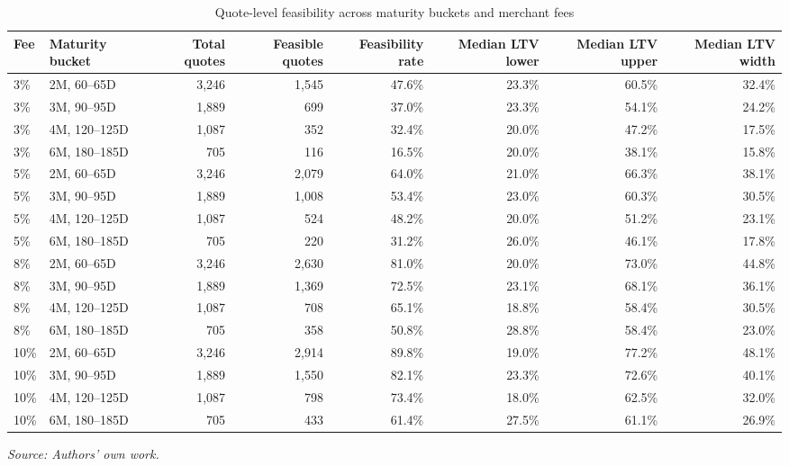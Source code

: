 \documentclass[11pt]{article}
\begin{document}
\begin{table}[htbp]
\centering
\caption{Quote-level feasibility across maturity buckets and merchant fees}
\label{tab:quote_level_feasibility}
\small
\begin{adjustbox}{max width=\textwidth}
\begin{tabular}{llrrrrrr}
\toprule
Fee & Maturity bucket & Total quotes & Feasible quotes & Feasibility rate & Median LTV lower & Median LTV upper & Median LTV width \\
\midrule
3\%  & 2M, 60--65D   & 3,246 & 1,545 & 47.6\% & 23.3\% & 60.5\% & 32.4\% \\
3\%  & 3M, 90--95D   & 1,889 & 699   & 37.0\% & 23.3\% & 54.1\% & 24.2\% \\
3\%  & 4M, 120--125D & 1,087 & 352   & 32.4\% & 20.0\% & 47.2\% & 17.5\% \\
3\%  & 6M, 180--185D & 705   & 116   & 16.5\% & 20.0\% & 38.1\% & 15.8\% \\
5\%  & 2M, 60--65D   & 3,246 & 2,079 & 64.0\% & 21.0\% & 66.3\% & 38.1\% \\
5\%  & 3M, 90--95D   & 1,889 & 1,008 & 53.4\% & 23.0\% & 60.3\% & 30.5\% \\
5\%  & 4M, 120--125D & 1,087 & 524   & 48.2\% & 20.0\% & 51.2\% & 23.1\% \\
5\%  & 6M, 180--185D & 705   & 220   & 31.2\% & 26.0\% & 46.1\% & 17.8\% \\
8\%  & 2M, 60--65D   & 3,246 & 2,630 & 81.0\% & 20.0\% & 73.0\% & 44.8\% \\
8\%  & 3M, 90--95D   & 1,889 & 1,369 & 72.5\% & 23.1\% & 68.1\% & 36.1\% \\
8\%  & 4M, 120--125D & 1,087 & 708   & 65.1\% & 18.8\% & 58.4\% & 30.5\% \\
8\%  & 6M, 180--185D & 705   & 358   & 50.8\% & 28.8\% & 58.4\% & 23.0\% \\
10\% & 2M, 60--65D   & 3,246 & 2,914 & 89.8\% & 19.0\% & 77.2\% & 48.1\% \\
10\% & 3M, 90--95D   & 1,889 & 1,550 & 82.1\% & 23.3\% & 72.6\% & 40.1\% \\
10\% & 4M, 120--125D & 1,087 & 798   & 73.4\% & 18.0\% & 62.5\% & 32.0\% \\
10\% & 6M, 180--185D & 705   & 433   & 61.4\% & 27.5\% & 61.1\% & 26.9\% \\
\bottomrule
\end{tabular}
\end{adjustbox}
\vspace{-0.5em}
\begin{flushleft}
\footnotesize \textit{Source: Authors' own work.}
\end{flushleft}
\end{table}
\end{document}
